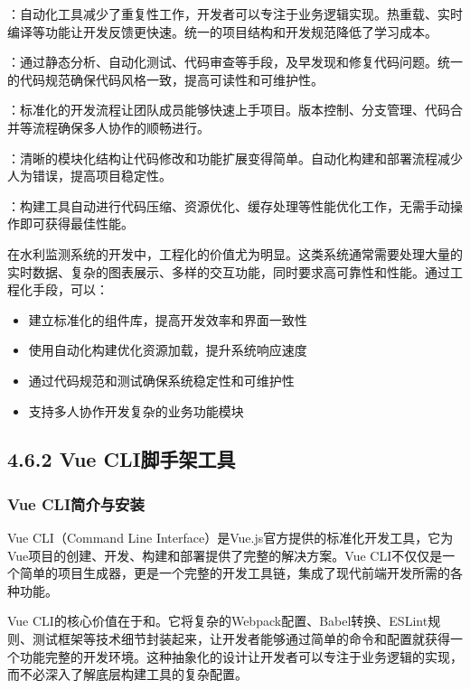 ：自动化工具减少了重复性工作，开发者可以专注于业务逻辑实现。热重载、实时编译等功能让开发反馈更快速。统一的项目结构和开发规范降低了学习成本。

：通过静态分析、自动化测试、代码审查等手段，及早发现和修复代码问题。统一的代码规范确保代码风格一致，提高可读性和可维护性。

：标准化的开发流程让团队成员能够快速上手项目。版本控制、分支管理、代码合并等流程确保多人协作的顺畅进行。

：清晰的模块化结构让代码修改和功能扩展变得简单。自动化构建和部署流程减少人为错误，提高项目稳定性。

：构建工具自动进行代码压缩、资源优化、缓存处理等性能优化工作，无需手动操作即可获得最佳性能。

在水利监测系统的开发中，工程化的价值尤为明显。这类系统通常需要处理大量的实时数据、复杂的图表展示、多样的交互功能，同时要求高可靠性和性能。通过工程化手段，可以：

\begin{itemize}
\tightlist
\item
  建立标准化的组件库，提高开发效率和界面一致性
\item
  使用自动化构建优化资源加载，提升系统响应速度
\item
  通过代码规范和测试确保系统稳定性和可维护性
\item
  支持多人协作开发复杂的业务功能模块
\end{itemize}

\hypertarget{vue-cliux811aux624bux67b6ux5de5ux5177}{%
\subsection{4.6.2 Vue CLI脚手架工具}\label{vue-cliux811aux624bux67b6ux5de5ux5177}}

\hypertarget{vue-cliux7b80ux4ecbux4e0eux5b89ux88c5}{%
\subsubsection{Vue CLI简介与安装}\label{vue-cliux7b80ux4ecbux4e0eux5b89ux88c5}}

Vue CLI（Command Line Interface）是Vue.js官方提供的标准化开发工具，它为Vue项目的创建、开发、构建和部署提供了完整的解决方案。Vue CLI不仅仅是一个简单的项目生成器，更是一个完整的开发工具链，集成了现代前端开发所需的各种功能。

Vue CLI的核心价值在于和。它将复杂的Webpack配置、Babel转换、ESLint规则、测试框架等技术细节封装起来，让开发者能够通过简单的命令和配置就获得一个功能完整的开发环境。这种抽象化的设计让开发者可以专注于业务逻辑的实现，而不必深入了解底层构建工具的复杂配置。

